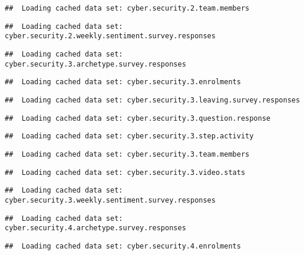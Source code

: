 \documentclass[]{article}
\begin{document}
\begin{verbatim}
##  Loading cached data set: cyber.security.2.team.members
\end{verbatim}

\begin{verbatim}
##  Loading cached data set: cyber.security.2.weekly.sentiment.survey.responses
\end{verbatim}

\begin{verbatim}
##  Loading cached data set: cyber.security.3.archetype.survey.responses
\end{verbatim}

\begin{verbatim}
##  Loading cached data set: cyber.security.3.enrolments
\end{verbatim}

\begin{verbatim}
##  Loading cached data set: cyber.security.3.leaving.survey.responses
\end{verbatim}

\begin{verbatim}
##  Loading cached data set: cyber.security.3.question.response
\end{verbatim}

\begin{verbatim}
##  Loading cached data set: cyber.security.3.step.activity
\end{verbatim}

\begin{verbatim}
##  Loading cached data set: cyber.security.3.team.members
\end{verbatim}

\begin{verbatim}
##  Loading cached data set: cyber.security.3.video.stats
\end{verbatim}

\begin{verbatim}
##  Loading cached data set: cyber.security.3.weekly.sentiment.survey.responses
\end{verbatim}

\begin{verbatim}
##  Loading cached data set: cyber.security.4.archetype.survey.responses
\end{verbatim}

\begin{verbatim}
##  Loading cached data set: cyber.security.4.enrolments
\end{verbatim}
\end{document}

